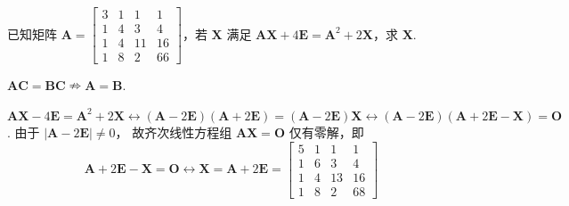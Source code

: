 \begin{problem}[本题8分]
  已知矩阵 $\mathbf A =
  \begin{bmatrix}
    3 & 1 & 1 & 1\\
    1 & 4 & 3 & 4\\
    1 & 4 & 11&16\\
    1 & 8 & 2 &66
  \end{bmatrix}$，若 $\mathbf X$ 满足
  $\mathbf{AX} + 4\mathbf E = \mathbf A^2 + 2\mathbf X$，求 $\mathbf X$.
\end{problem}
\begin{remark}
  $\mathbf{AC} = \mathbf{BC}\nRightarrow \mathbf A = \mathbf B$.
\end{remark}
\scratch[12ex]
\begin{solution}
  $\mathbf{AX} - 4\mathbf E = \mathbf A^2 + 2\mathbf X\longleftrightarrow
    (\mathbf A - 2\mathbf E)(\mathbf A + 2\mathbf E) =
    (\mathbf A - 2\mathbf E)\mathbf X \longleftrightarrow
    (\mathbf A - 2\mathbf E)(\mathbf A + 2\mathbf E - \mathbf X) = \mathbf O$.
  由于 $|\mathbf A - 2\mathbf E| \neq 0$，
  故齐次线性方程组 $\mathbf{AX} = \mathbf O$ 仅有零解，即
  \[\mathbf A + 2\mathbf E - \mathbf X = \mathbf O\longleftrightarrow
  \mathbf X = \mathbf A + 2\mathbf E =
  \begin{bmatrix}
    5 & 1 & 1 & 1\\
    1 & 6 & 3 & 4\\
    1 & 4 &13 &16\\
    1 & 8 & 2 &68
  \end{bmatrix}\]
\end{solution}

